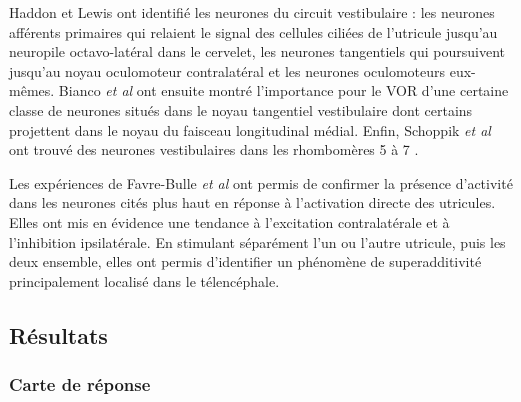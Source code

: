 Haddon et Lewis \cite{haddon_early_1996} ont identifié les neurones du circuit vestibulaire : les neurones afférents primaires qui relaient le signal des cellules ciliées de l'utricule jusqu'au neuropile octavo-latéral dans le cervelet, les neurones tangentiels qui poursuivent jusqu'au noyau oculomoteur contralatéral et les neurones oculomoteurs eux-mêmes. Bianco \emph{et al} \cite{bianco_tangential_2012} ont ensuite montré l'importance pour le VOR d'une certaine classe de neurones situés dans le noyau tangentiel vestibulaire dont certains projettent dans le noyau du faisceau longitudinal médial. Enfin, Schoppik \emph{et al} ont trouvé des neurones vestibulaires dans les rhombomères 5 à 7 \cite{schoppik_gaze-stabilizing_2017}.

Les expériences de Favre-Bulle \emph{et al} ont permis de confirmer la présence d'activité dans les neurones cités plus haut en réponse à l'activation directe des utricules. Elles ont mis en évidence une tendance à l'excitation contralatérale et à l'inhibition ipsilatérale. En stimulant séparément l'un ou l'autre utricule, puis les deux ensemble, elles ont permis d'identifier un phénomène de superadditivité principalement localisé dans le télencéphale.

\subsection{Résultats}

\subsubsection{Carte de réponse}

